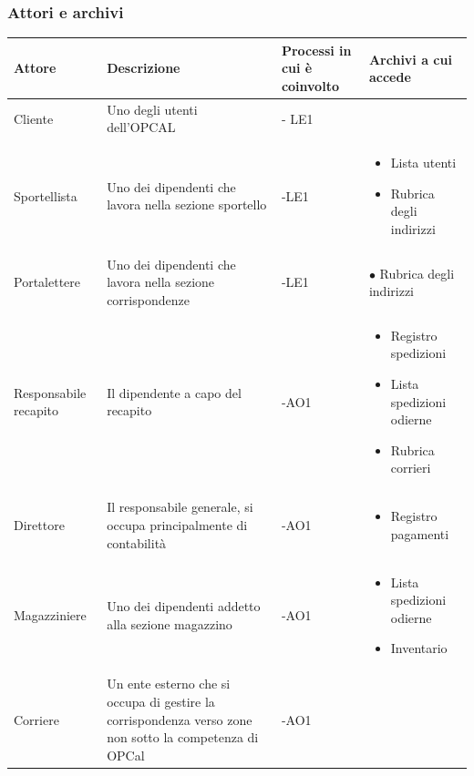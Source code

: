 \documentclass[a4paper,12pt]{article}
\begin{document}
\subsubsection{Attori e archivi}
\begin{table}[H]
  \centering
  \begin{tabular}{|>{\centering\arraybackslash}m{}|
                  >{\centering\arraybackslash}m{}|
                  >{\centering\arraybackslash}m{}|
                  >{\centering\arraybackslash}m{}|}
    \hline
    \textbf{Attore} & \textbf{Descrizione} & \textbf{Processi in cui è coinvolto} & \textbf{Archivi a cui accede} \\ 
    \hline
    Cliente & Uno degli utenti dell'OPCAL & - LE1 & \\ 
    \hline 
    Sportellista & Uno dei dipendenti che lavora nella sezione sportello & -LE1 & \begin{itemize} \item Lista utenti 
    \item Rubrica degli indirizzi \end{itemize} \\ 
      \hline 
      Portalettere & Uno dei dipendenti che lavora nella sezione corrispondenze & -LE1 & $\bullet$ Rubrica degli indirizzi \\ 
      \hline
      Responsabile recapito & Il dipendente a capo del recapito & -AO1 &
      \begin{itemize}
        \item{Registro spedizioni}
        \item{Lista spedizioni odierne}
        \item{Rubrica corrieri}
      \end{itemize} \\
      \hline
      Direttore & Il responsabile generale, si occupa principalmente di contabilità & -AO1 &
      \begin{itemize}
        \item{Registro pagamenti}
      \end{itemize} \\
      \hline
      Magazziniere & Uno dei dipendenti addetto alla sezione magazzino & -AO1 &
      \begin{itemize}
        \item{Lista spedizioni odierne}
        \item{Inventario}
      \end{itemize} \\
      \hline
      Corriere & Un ente esterno che si occupa di gestire la corrispondenza verso zone non sotto la competenza di OPCal & -AO1 & \\
      \hline
  \end{tabular}
\end{table}
\end{document}
